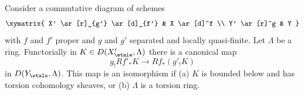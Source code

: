 %
\begin{lemma}
\label{lemma-shriek-proper-and-open}
Consider a commutative diagram of schemes
$$
\xymatrix{
X' \ar[r]_{g'} \ar[d]_{f'} & X \ar[d]^f \\
Y' \ar[r]^g & Y
}
$$
with $f$ and $f'$ proper and $g$ and $g'$ separated and locally quasi-finite.
Let $\Lambda$ be a ring. Functorially in $K \in D(X'_\etale, \Lambda)$
there is a canonical map
$$
g_!Rf'_*K \longrightarrow Rf_*(g'_!K)
$$
in $D(Y_\etale, \Lambda)$. This map is an isomorphism if
(a) $K$ is bounded below and has torsion cohomology sheaves, or
(b) $\Lambda$ is a torsion ring.
\end{lemma}


